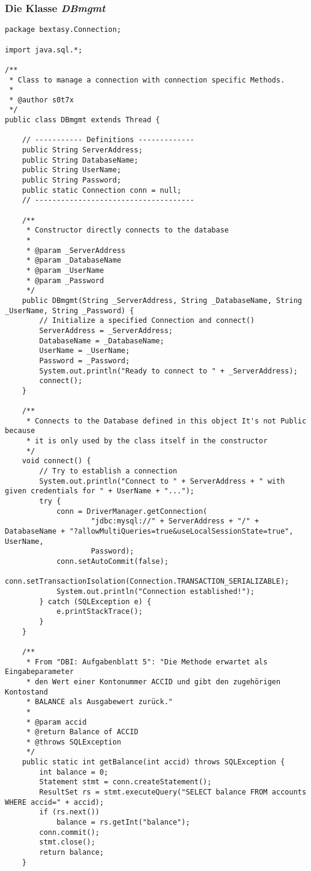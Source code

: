 \documentclass[a4paper, bibliography=totoc, 12pt]{scrartcl}
\begin{document}
\subsubsection{Die Klasse \emph{DBmgmt}}
\begin{lstlisting}
package bextasy.Connection;

import java.sql.*;

/**
 * Class to manage a connection with connection specific Methods.
 * 
 * @author s0t7x
 */
public class DBmgmt extends Thread {

	// ----------- Definitions -------------
	public String ServerAddress;
	public String DatabaseName;
	public String UserName;
	public String Password;
	public static Connection conn = null;
	// -------------------------------------

	/**
	 * Constructor directly connects to the database
	 * 
	 * @param _ServerAddress
	 * @param _DatabaseName
	 * @param _UserName
	 * @param _Password
	 */
	public DBmgmt(String _ServerAddress, String _DatabaseName, String _UserName, String _Password) {
		// Initialize a specified Connection and connect()
		ServerAddress = _ServerAddress;
		DatabaseName = _DatabaseName;
		UserName = _UserName;
		Password = _Password;
		System.out.println("Ready to connect to " + _ServerAddress);
		connect();
	}

	/**
	 * Connects to the Database defined in this object It's not Public because
	 * it is only used by the class itself in the constructor
	 */
	void connect() {
		// Try to establish a connection
		System.out.println("Connect to " + ServerAddress + " with given credentials for " + UserName + "...");
		try {
			conn = DriverManager.getConnection(
					"jdbc:mysql://" + ServerAddress + "/" + DatabaseName + "?allowMultiQueries=true&useLocalSessionState=true", UserName,
					Password);
			conn.setAutoCommit(false);
			conn.setTransactionIsolation(Connection.TRANSACTION_SERIALIZABLE);
			System.out.println("Connection established!");
		} catch (SQLException e) {
			e.printStackTrace();
		}
	}

	/**
	 * From "DBI: Aufgabenblatt 5": "Die Methode erwartet als Eingabeparameter
	 * den Wert einer Kontonummer ACCID und gibt den zugehörigen Kontostand
	 * BALANCE als Ausgabewert zurück."
	 * 
	 * @param accid
	 * @return Balance of ACCID
	 * @throws SQLException
	 */
	public static int getBalance(int accid) throws SQLException {
		int balance = 0;
		Statement stmt = conn.createStatement();
		ResultSet rs = stmt.executeQuery("SELECT balance FROM accounts WHERE accid=" + accid);
		if (rs.next())
			balance = rs.getInt("balance");
		conn.commit();
		stmt.close();
		return balance;
	}


\end{lstlisting}
\end{document}
